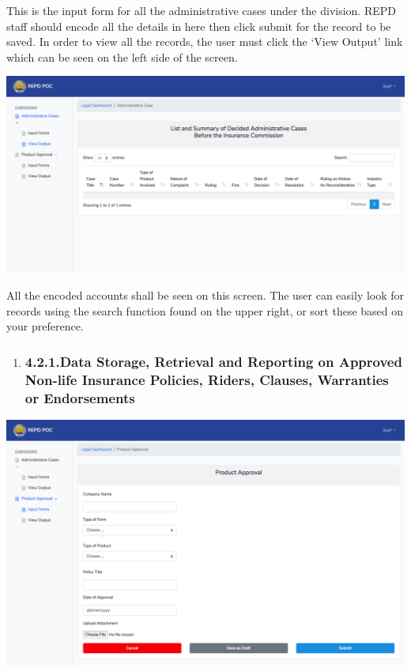 \documentclass{article}
\begin{document}
This is the input form for all the administrative
cases under the division. REPD staff should encode all the details in
here then click submit for the record to be saved. In order to view all
the records, the user must click the ‘View Output’ link which can be
seen on the left side of the screen.%

\includegraphics[keepaspectratio=true]{up-ic-screens/image121}{}%

All the encoded accounts shall be seen on this screen.
The user can easily look for records using the search function found on
the upper right, or sort these based on your preference.%

\begin{enumerate}[noitemsep,topsep=\mdcompacttopsep]%

\item{}
\subsubsection{4.2.1.\hspace*{0.5em}Data Storage, Retrieval and Reporting on Approved Non-life Insurance Policies, Riders, Clauses, Warranties or Endorsements}\label{sec-data-storage-retrieval-and-reporting-on-approved-non-life-insurance-policies-riders-clauses-warranties-or-endorsements}%
\end{enumerate}%

\noindent{}\includegraphics[keepaspectratio=true]{up-ic-screens/image161}{}%
\end{document}
